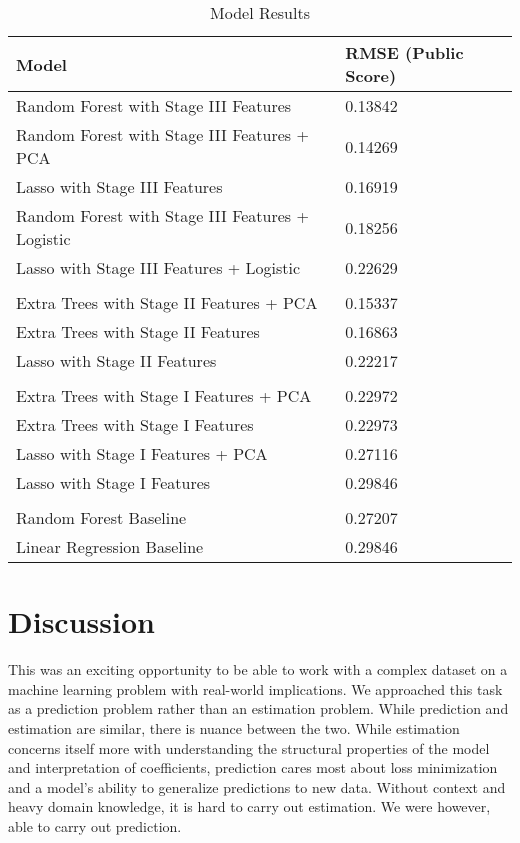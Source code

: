 \documentclass[11pt, oneside]{article}   	%
\begin{document}
\begin{table}[]
\centering

\label{my-label}
\begin{tabular}{@{}ll@{}}
\toprule
\textbf{Model} & \textbf{RMSE (Public Score)} \\ \midrule
Random Forest with Stage III Features & 0.13842\\
Random Forest with Stage III Features  + PCA & 0.14269\\
Lasso with Stage III Features &  0.16919\\
Random Forest with Stage III Features + Logistic &  0.18256 \\
Lasso with Stage III Features + Logistic & 0.22629 \\


\\
Extra Trees with Stage II Features + PCA & 0.15337\\
Extra Trees with Stage II Features & 0.16863     \\
Lasso with Stage II Features & 0.22217\\
\\

Extra Trees with Stage I Features + PCA &  0.22972 \\
Extra Trees with Stage I Features & 0.22973\\
Lasso with Stage I Features + PCA & 0.27116\\
Lasso with Stage I Features &  0.29846\\


\\
Random Forest Baseline &  0.27207\\
Linear Regression Baseline & 0.29846  \\

\bottomrule
\end{tabular}
\caption{Model Results}
\end{table}

\section{Discussion}
This was an exciting opportunity to be able to work with a complex dataset on a machine learning problem with real-world implications. We approached this task as a prediction problem rather than an estimation problem. While prediction and estimation are similar, there is nuance between the two. While estimation concerns itself more with understanding the structural properties of the model and interpretation of coefficients, prediction cares most about loss minimization and a model's ability to generalize predictions to new data. Without context and heavy domain knowledge, it is hard to carry out estimation. We were however, able to carry out prediction. 
\end{document}
